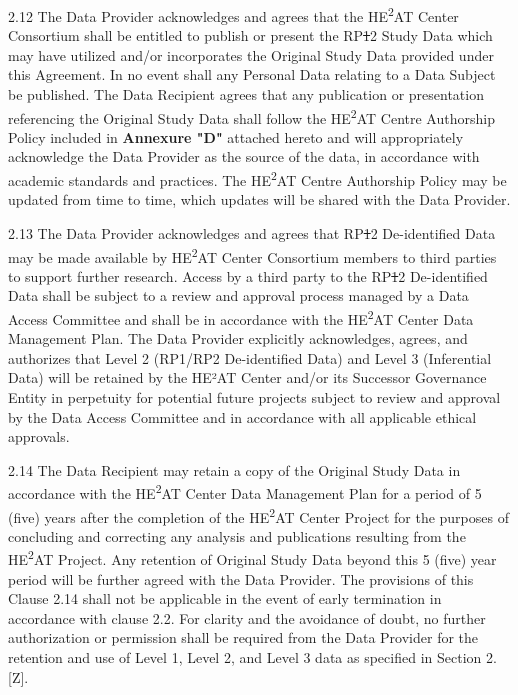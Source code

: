 \documentclass[12pt,letterpaper]{article}
\newcommand{\deleted}[1]{\textcolor{deletecolor}{\sout{#1}}}
\newcommand{\added}[1]{\textcolor{addcolor}{#1}}
\begin{document}
2.12 The Data Provider acknowledges and agrees that the HE\textsuperscript{2}AT Center Consortium shall be entitled to publish or present the RP\deleted{1}\added{2} Study Data which may have utilized and/or incorporates the Original Study Data provided under this Agreement. In no event shall any Personal Data relating to a Data Subject be published. The Data Recipient agrees that any publication or presentation referencing the Original Study Data shall follow the HE\textsuperscript{2}AT Centre Authorship Policy included in \textbf{Annexure "D"} attached hereto and will appropriately acknowledge the Data Provider as the source of the data, in accordance with academic standards and practices. The HE\textsuperscript{2}AT Centre Authorship Policy may be updated from time to time, which updates will be shared with the Data Provider.

2.13 The Data Provider acknowledges and agrees that RP\deleted{1}\added{2} De-identified Data may be made available by HE\textsuperscript{2}AT Center Consortium members to third parties to support further research. Access by a third party to the RP\deleted{1}\added{2} De-identified Data shall be subject to a review and approval process managed by a Data Access Committee and shall be in accordance with the HE\textsuperscript{2}AT Center Data Management Plan. \added{The Data Provider explicitly acknowledges, agrees, and authorizes that Level 2 (RP1/RP2 De-identified Data) and Level 3 (Inferential Data) will be retained by the HE²AT Center and/or its Successor Governance Entity in perpetuity for potential future projects subject to review and approval by the Data Access Committee and in accordance with all applicable ethical approvals.}

2.14 The Data Recipient may retain a copy of the Original Study Data in accordance with the HE\textsuperscript{2}AT Center Data Management Plan for a period of 5 (five) years after the completion of the HE\textsuperscript{2}AT Center Project for the purposes of concluding and correcting any analysis and publications resulting from the HE\textsuperscript{2}AT Project. Any retention of Original Study Data beyond this 5 (five) year period will be further agreed with the Data Provider. The provisions of this Clause 2.14 shall not be applicable in the event of early termination in accordance with clause 2.2. \added{For clarity and the avoidance of doubt, no further authorization or permission shall be required from the Data Provider for the retention and use of Level 1, Level 2, and Level 3 data as specified in Section 2.[Z].}
\end{document}
